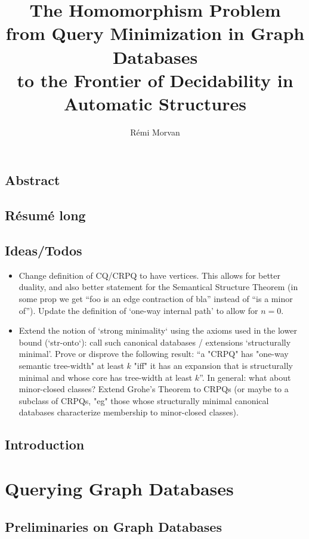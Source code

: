 \documentclass[a4paper,sfsidenotes,twoside,justified,nobib]{tufte-book-custom}
\title[The Homomorphism Problem]{The Homomorphism Problem\\from Query Minimization in Graph Databases\\ to the Frontier of Decidability in Automatic Structures}
\author{Rémi Morvan}
\begin{document}
\frontmatter




\mainmatter
\chapter*{Abstract}

\chapter*{Résumé long}

\chapter*{Ideas/Todos}

\begin{itemize}
	\item Change definition of CQ/CRPQ to have vertices. This allows for better duality,
		and also better statement for the Semantical Structure Theorem (in some prop we get
		``foo is an edge contraction of bla'' instead of ``is a minor of'').
		Update the definition of `one-way internal path' to allow for $n=0$.
	\item Extend the notion of `strong minimality` using the axioms used in the lower bound (`str-onto`): call such canonical databases / extensions `structurally minimal'.
	Prove or disprove the following result: ``a "CRPQ" has "one-way semantic tree-width" at least $k$ "iff" it has an expansion that is structurally minimal and whose core has tree-width at least $k$''. In general: what about minor-closed classes?
	Extend Grohe's Theorem to CRPQs (or maybe to a subclass of CRPQs, "eg" those whose
	structurally minimal canonical databases characterize membership to minor-closed classes).
\end{itemize}

\chapter{Introduction}

\part{Querying Graph Databases}

\chapter{Preliminaries on Graph Databases}
\end{document}
